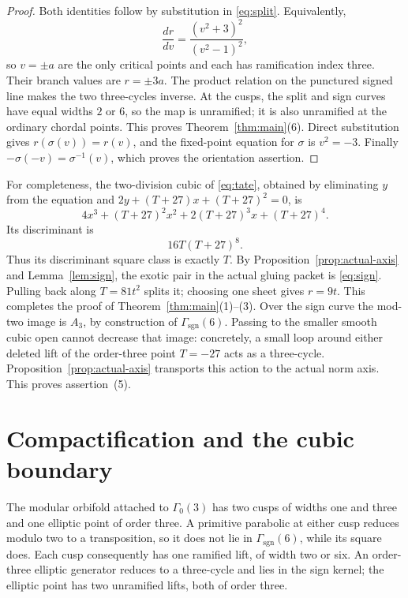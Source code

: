 \documentclass[11pt]{article}
\numberwithin{equation}{section}
\theoremstyle{definition}
\theoremstyle{remark}
\begin{document}
\begin{proof}
Both identities follow by substitution in \eqref{eq:split}.  Equivalently,
\[
 \frac{dr}{dv}=\frac{(v^2+3)^2}{(v^2-1)^2},
\]
so \(v=\pm a\) are the only critical points and each has ramification index
three.  Their branch values are \(r=\pm3a\).  The product relation on the
punctured signed line makes the two three-cycles inverse.  At the cusps, the
split and sign curves have equal widths \(2\) or \(6\), so the map is
unramified; it is also unramified at the ordinary chordal points.  This proves
Theorem~\ref{thm:main}(6).  Direct substitution gives
\(r(\sigma(v))=r(v)\), and the fixed-point equation for \(\sigma\) is
\(v^2=-3\).  Finally
\(-\sigma(-v)=\sigma^{-1}(v)\), which proves the orientation assertion.
\end{proof}

For completeness, the two-division cubic of \eqref{eq:tate}, obtained by
eliminating \(y\) from the equation and
\(2y+(T+27)x+(T+27)^2=0\), is
\[
 4x^3+(T+27)^2x^2+2(T+27)^3x+(T+27)^4.
\]
Its discriminant is
\begin{equation}\label{eq:disc}
 16T(T+27)^8.
\end{equation}
Thus its discriminant square class is exactly \(T\).  By
Proposition~\ref{prop:actual-axis} and Lemma~\ref{lem:sign}, the exotic pair
in the actual gluing packet is \eqref{eq:sign}.  Pulling back along
\(T=81t^2\) splits it; choosing one sheet gives \(r=9t\).  This completes
the proof of Theorem~\ref{thm:main}(1)--(3).  Over the sign curve the mod-two
image is \(A_3\), by construction of \(\Gamma_{\mathrm{sgn}}(6)\).  Passing
to the smaller smooth cubic open cannot decrease that image: concretely, a
small loop around either deleted lift of the order-three point \(T=-27\)
acts as a three-cycle.  Proposition~\ref{prop:actual-axis} transports this
action to the actual norm axis.  This proves assertion~(5).

\section{Compactification and the cubic boundary}

The modular orbifold attached to \(\Gamma_0(3)\) has two cusps of widths one
and three and one
elliptic point of order three.  A primitive parabolic at either cusp reduces
modulo two to a transposition, so it does not lie in
\(\Gamma_{\mathrm{sgn}}(6)\), while its square does.  Each cusp consequently
has one ramified lift, of width two or six.  An order-three elliptic generator
reduces to a three-cycle and lies in the sign kernel; the elliptic point has
two unramified lifts, both of order three.
\end{document}
